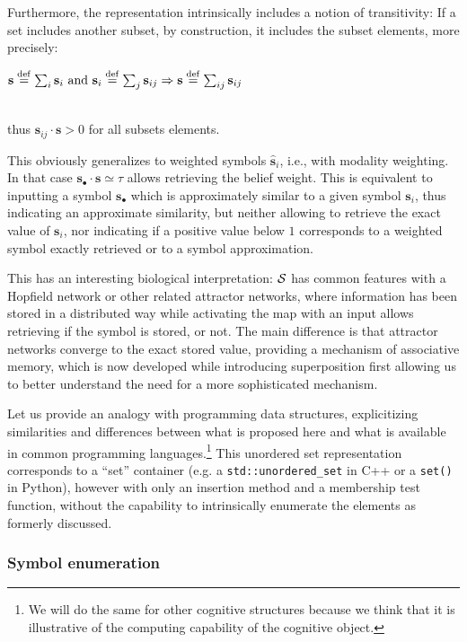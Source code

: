 \documentclass[sn-mathphys]{sn-jnl}
\newcommand{\defq}{\stackrel {\rm def}{=}}
\newcommand{\eqline}[1]{~\vspace{0.1cm}\\\centerline{$#1$}\vspace{0.1cm}\\}
\begin{document}
\begin{appendices}
Furthermore, the representation intrinsically includes a notion of transitivity: If a set includes another subset, by construction, it includes the subset elements, more precisely:
\eqline{\mathbf{s} \defq \sum_i \mathbf{s}_i \mbox{ and } \mathbf{s}_i \defq \sum_j \mathbf{s}_{ij} \Rightarrow \mathbf{s} \defq \sum_{ij} \mathbf{s}_{ij}}
thus $\mathbf{s}_{ij} \cdot \mathbf{s} > 0$ for all subsets elements.

This obviously generalizes to weighted symbols $\hat{\mathbf{s}}_i$, i.e., with modality weighting. In that case $\mathbf{s}_\bullet \cdot \mathbf{s} \simeq \tau$ allows retrieving the belief weight. This is equivalent to inputting a symbol $\mathbf{s}_\bullet$ which is approximately similar to a given symbol $\mathbf{s}_i$, thus indicating an approximate similarity, but neither allowing to retrieve the exact value of $\mathbf{s}_i$, nor indicating if a positive value below $1$ corresponds to a weighted symbol exactly retrieved or to a symbol approximation.

This has an interesting biological interpretation: ${\cal S}$ has common features with a Hopfield network or other related attractor networks, where information has been stored in a distributed way while activating the map with an input allows retrieving if the symbol is stored, or not. The main difference is that attractor networks converge to the exact stored value, providing a mechanism of associative memory, which is now developed while introducing superposition first allowing us to better understand the need for a more sophisticated mechanism.

Let us provide an analogy with programming data structures, explicitizing similarities and differences between what is proposed here and what is available in common programming languages.\footnote{We will do the same for other cognitive structures because we think that it is illustrative of the computing capability of the cognitive object.} This unordered set representation corresponds to a ``set'' container (e.g. a {\tt std::unordered\_set} in C++ or a {\tt set()} in Python), however with only an insertion method and a membership test function, without the capability to intrinsically enumerate the elements as formerly discussed.

\subsubsection{Symbol enumeration}


\end{appendices}
\end{document}
